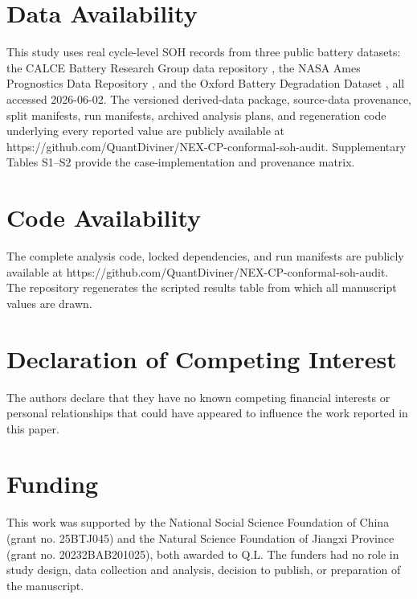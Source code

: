 \documentclass[
  number,
  preprint]{elsarticle}
\begin{document}
\section*{Data Availability}\label{data-availability}

This study uses real cycle-level SOH records from three public battery
datasets: the CALCE Battery Research Group data repository
\citep{calce_battery_data}, the NASA Ames Prognostics Data Repository
\citep{nasa_pcoe_battery_data}, and the Oxford Battery Degradation
Dataset \citep{howey2017oxford}, all accessed 2026-06-02. The versioned
derived-data package, source-data provenance, split manifests, run
manifests, archived analysis plans, and regeneration code underlying
every reported value are publicly available at
https://github.com/QuantDiviner/NEX-CP-conformal-soh-audit.
Supplementary Tables S1--S2 provide the case-implementation and
provenance matrix.

\section*{Code Availability}\label{code-availability}

The complete analysis code, locked dependencies, and run manifests are
publicly available at
https://github.com/QuantDiviner/NEX-CP-conformal-soh-audit. The
repository regenerates the scripted results table from which all
manuscript values are drawn.

\section*{Declaration of Competing
Interest}\label{declaration-of-competing-interest}

The authors declare that they have no known competing financial
interests or personal relationships that could have appeared to
influence the work reported in this paper.

\section*{Funding}\label{funding}

This work was supported by the National Social Science Foundation of
China (grant no. 25BTJ045) and the Natural Science Foundation of Jiangxi
Province (grant no. 20232BAB201025), both awarded to Q.L. The funders
had no role in study design, data collection and analysis, decision to
publish, or preparation of the manuscript.
\end{document}
